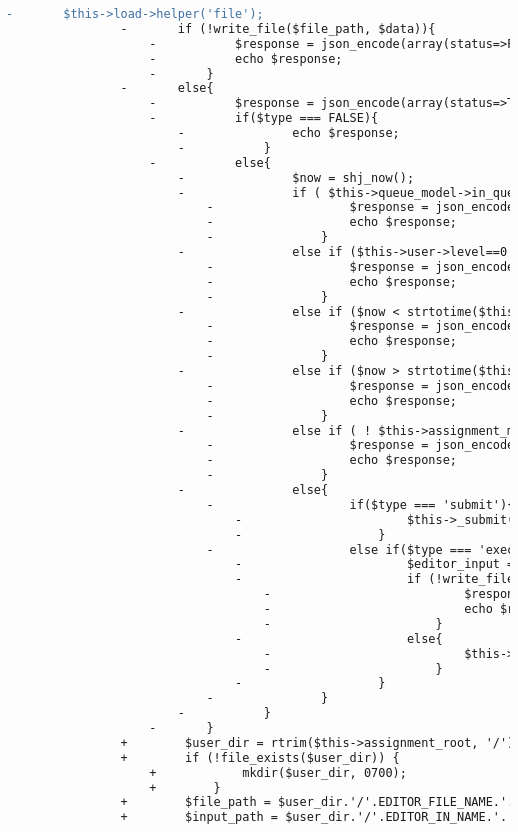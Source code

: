 \begin{lstlisting}[language=diff, caption=Perubahan pada kode Submit.php]
				-		$this->load->helper('file');
				-		if (!write_file($file_path, $data)){
					-			$response = json_encode(array(status=>FALSE, message=>'Unable to save'));
					-			echo $response;
					-		}
				-		else{
					-			$response = json_encode(array(status=>TRUE, message=>'Saved'));
					-			if($type === FALSE){
						-				echo $response;
						-			}
					-			else{
						-				$now = shj_now();
						-				if ( $this->queue_model->in_queue($this->user->username,$this->user->selected_assignment['id'], $this->problem['id'])){
							-					$response = json_encode(array(status=>FALSE, message=>'You have already submitted for this problem. Your last submission is still in queue.'));
							-					echo $response;
							-				}
						-				else if ($this->user->level==0 && !$this->user->selected_assignment['open']){
							-					$response = json_encode(array(status=>FALSE, message=>'Selected assignment has been closed.'));
							-					echo $response;
							-				}
						-				else if ($now < strtotime($this->user->selected_assignment['start_time'])){
							-					$response = json_encode(array(status=>FALSE, message=>'Selected assignment has not started.'));
							-					echo $response;
							-				}
						-				else if ($now > strtotime($this->user->selected_assignment['finish_time'])+$this->user->selected_assignment['extra_time']){
							-					$response = json_encode(array(status=>FALSE, message=>'Selected assignment has finished.'));
							-					echo $response;
							-				}
						-				else if ( ! $this->assignment_model->is_participant($this->user->selected_assignment['participants'],$this->user->username)){
							-					$response = json_encode(array(status=>FALSE, message=>'You are not registered for submitting.'));
							-					echo $response;
							-				}
						-				else{
							-					if($type === 'submit'){
								-						$this->_submit($data, $problem_id, $language, $user_dir);
								-					}
							-					else if($type === 'execute'){
								-						$editor_input =  $_POST['editor_input'];
								-						if (!write_file($input_path, $editor_input)){
									-							$response = json_encode(array(status=>FALSE, message=>'Unable to write input file'));
									-							echo $response;
									-						}
								-						else{
									-							$this->_execute($data, $problem_id, $language, $user_dir);
									-						}
								-					}
							-				}
						-			}
					-		}
				+        $user_dir = rtrim($this->assignment_root, '/').'/assignment_'.$this->user->selected_assignment['id'].'/p'.$problem_id.'/'.$this->user->username;
				+        if (!file_exists($user_dir)) {
					+            mkdir($user_dir, 0700);
					+        }
				+        $file_path = $user_dir.'/'.EDITOR_FILE_NAME.'.'.EDITOR_FILE_EXT;
				+        $input_path = $user_dir.'/'.EDITOR_IN_NAME.'.'.EDITOR_FILE_EXT;
				

\end{lstlisting}
